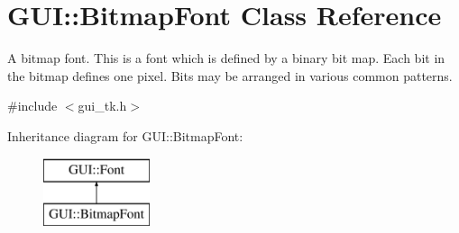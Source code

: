 \hypertarget{classGUI_1_1BitmapFont}{\section{G\-U\-I\-:\-:Bitmap\-Font Class Reference}
\label{classGUI_1_1BitmapFont}
}


A bitmap font. This is a font which is defined by a binary bit map. Each bit in the bitmap defines one pixel. Bits may be arranged in various common patterns.  




{\ttfamily \#include $<$gui\-\_\-tk.\-h$>$}

Inheritance diagram for G\-U\-I\-:\-:Bitmap\-Font\-:\begin{figure}[H]
\begin{center}
\leavevmode
\includegraphics[height=2.000000cm]{classGUI_1_1BitmapFont}
\end{center}
\end{figure}
